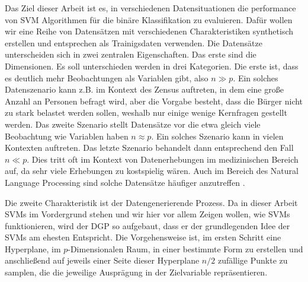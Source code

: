 \documentclass[
]{article}
\begin{document}
Das Ziel dieser Arbeit ist es, in verschiedenen Datensituationen die
performance von SVM Algorithmen für die binäre Klassifikation zu
evaluieren. Dafür wollen wir eine Reihe von Datensätzen mit
verschiedenen Charakteristiken synthetisch erstellen und entsprechen als
Trainigsdaten verwenden. Die Datensätze unterscheiden sich in zwei
zentralen Eigenschaften. Das erste sind die Dimensionen. Es soll
unterschieden werden in drei Kategorien. Die erste ist, dass es deutlich
mehr Beobachtungen als Variablen gibt, also \(n \gg p\). Ein solches
Datenszenario kann z.B. im Kontext des Zensus auftreten, in dem eine
große Anzahl an Personen befragt wird, aber die Vorgabe besteht, dass
die Bürger nicht zu stark belastet werden sollen, weshalb nur einige
wenige Kernfragen gestellt werden. Das zweite Szenario stellt Datensätze
vor die etwa gleich viele Beobachtung wie Variablen haben
\(n \approx p\). Ein solches Szenario kann in vielen Kontexten
auftreten. Das letzte Szenario behandelt dann entsprechend den Fall
\(n \ll p\). Dies tritt oft im Kontext von Datenerhebungen im
medizinischen Bereich auf, da sehr viele Erhebungen zu kostspielig
wären. Auch im Bereich des Natural Language Processing sind solche
Datensätze häufiger anzutreffen
\parencite{scholzComparisonClassificationMethods2021}.

Die zweite Charakteristik ist der Datengenerierende Prozess. Da in
dieser Arbeit SVMs im Vordergrund stehen und wir hier vor allem Zeigen
wollen, wie SVMs funktionieren, wird der DGP so aufgebaut, dass er der
grundlegenden Idee der SVMs am ehesten Entspricht. Die Vorgehensweise
ist, im ersten Schritt eine Hyperplane, im \(p\)-Dimensionalen Raum, in
einer bestimmte Form zu erstellen und anschließend auf jeweils einer
Seite dieser Hyperplane \(n/2\) zufällige Punkte zu samplen, die die
jeweilige Ausprägung in der Zielvariable repräsentieren.
\end{document}
